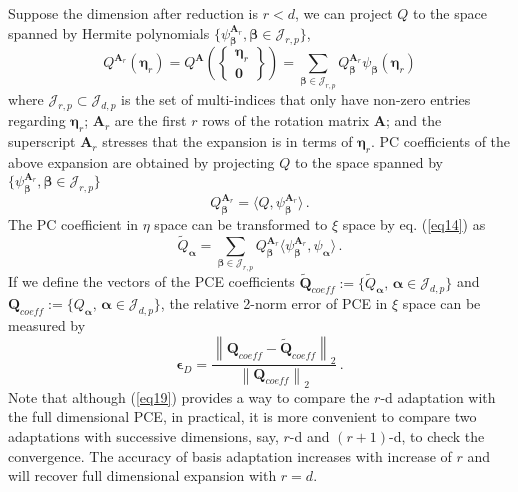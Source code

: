 Suppose the dimension after reduction is $r<d$, we can project $Q$ to the space spanned by Hermite polynomials $\{ \psi_{ \bm{\beta} }^{ \bm{A}_r }, \bm\beta \in \mathcal{J}_{r,p}\}$,
\begin{equation}
\label{eq10}
{Q}^{\bm{A}_r}(\bm{\eta}_r)
= {Q}^{\bm{A}}\left(\begin{Bmatrix} \bm{\eta}_r \\ \bm{0} \end{Bmatrix}\right)
= \sum_{\bm{\beta}\in\mathcal{J}_{r,p}} Q_{\bm{\beta}}^{\bm{A}_r} \psi_{\bm{\beta}}(\bm{\eta}_r)
\end{equation}
where $\mathcal{J}_{r,p}\subset\mathcal{J}_{d,p}$ is the set of multi-indices that only have non-zero entries regarding $\bm{\eta}_r$; $\bm{A}_r$ are the first $r$ rows of the rotation matrix $\bm{A}$; and the superscript $\bm{A}_r$ stresses that the expansion is in terms of $\bm{\eta}_r$. PC coefficients of the above expansion are obtained by projecting $Q$ to the space spanned by $\{\psi_{\bm{\beta}}^{\bm{A}_r}, \bm\beta \in \mathcal{J}_{r,p}\}$
\begin{equation}
\label{eq11}
Q_{\bm{\beta}}^{\bm{A}_r} = \langle Q, \psi_{ \bm{\beta}}^{\bm{A}_r} \rangle\,.
\end{equation}
The PC coefficient in $\eta$ space can be transformed to $\xi$ space by eq. (\ref{eq14}) as
\begin{equation}
\tilde{Q}_{\bm{\alpha}} = \sum_{\bm{\beta}\in\mathcal{J}_{r,p}} Q_{\bm{\beta}}^{\bm{A}_r} \langle \psi_{\bm{\beta}}^{\bm{A}_r}, \psi_{\bm \alpha} \rangle\,.
\end{equation}
If we define the vectors of the PCE coefficients $\tilde{\bm{Q}}_{coeff} := \{\tilde{Q}_{\bm{\alpha}},\, \bm{\alpha}\in\mathcal{J}_{d,p}\}$ and $\bm{Q}_{coeff} := \{Q_{\bm{\alpha}},\, \bm{\alpha}\in\mathcal{J}_{d,p}\}$, the relative 2-norm error of PCE in $\xi$ space can be measured by
\begin{equation}
\label{eq19}
\bm{\epsilon}_D = \frac{\left\| \bm{Q}_{coeff} - \tilde{\bm{Q}}_{coeff} \right\|_2} {\left\| \bm{Q}_{coeff} \right\|_2} \,.
\end{equation}
Note that although (\ref{eq19}) provides a way to compare the $r$-d adaptation with the full dimensional PCE, in practical, it is more convenient to compare two adaptations with successive dimensions, say, $r$-d and $(r+1)$-d, to check the convergence. The accuracy of basis adaptation increases with increase of $r$ and will recover full dimensional expansion with $r=d$. 

